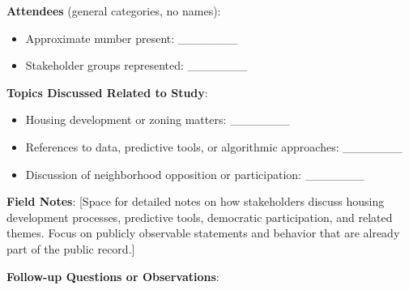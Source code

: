 \documentclass[12pt]{article}
\begin{document}
\textbf{Attendees} (general categories, no names):
\begin{itemize}[leftmargin=2em]
    \item Approximate number present: \_\_\_\_\_\_\_
    \item Stakeholder groups represented: \_\_\_\_\_\_\_
\end{itemize}

\textbf{Topics Discussed Related to Study}:
\begin{itemize}[leftmargin=2em]
    \item Housing development or zoning matters: \_\_\_\_\_\_\_
    \item References to data, predictive tools, or algorithmic approaches: \_\_\_\_\_\_\_
    \item Discussion of neighborhood opposition or participation: \_\_\_\_\_\_\_
\end{itemize}

\textbf{Field Notes}:
[Space for detailed notes on how stakeholders discuss housing development processes, predictive tools, democratic participation, and related themes. Focus on publicly observable statements and behavior that are already part of the public record.]

\textbf{Follow-up Questions or Observations}:
\end{document}
